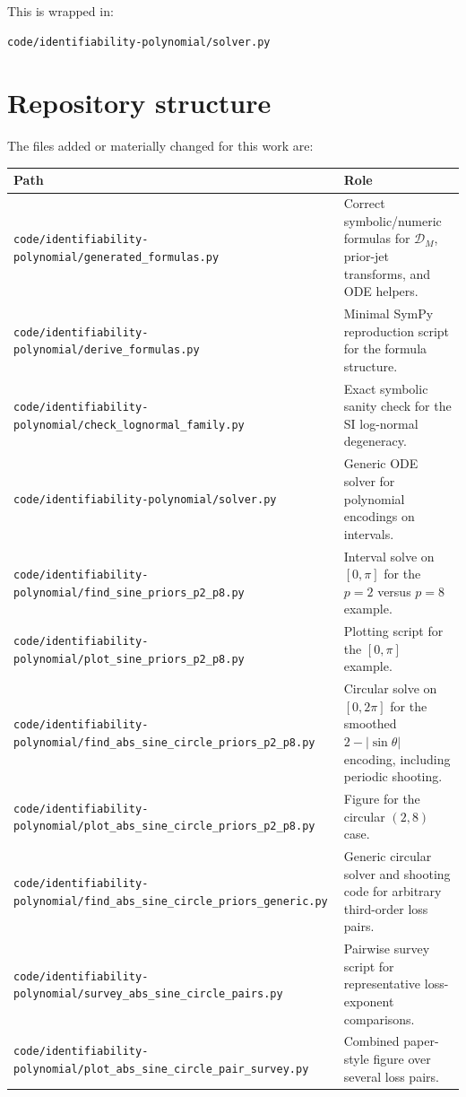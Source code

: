 \documentclass[11pt]{article}
\begin{document}
This is wrapped in:
\begin{Verbatim}[fontsize=\small]
code/identifiability-polynomial/solver.py
\end{Verbatim}

\section{Repository structure}

The files added or materially changed for this work are:

\begin{longtable}{p{}p{}}
\toprule
\textbf{Path} & \textbf{Role} \\
\midrule
\endhead
\texttt{code/identifiability-polynomial/generated\_formulas.py} & Correct symbolic/numeric formulas for $\mathcal{D}_M$, prior-jet transforms, and ODE helpers. \\
\texttt{code/identifiability-polynomial/derive\_formulas.py} & Minimal SymPy reproduction script for the formula structure. \\
\texttt{code/identifiability-polynomial/check\_lognormal\_family.py} & Exact symbolic sanity check for the SI log-normal degeneracy. \\
\texttt{code/identifiability-polynomial/solver.py} & Generic ODE solver for polynomial encodings on intervals. \\
\texttt{code/identifiability-polynomial/find\_sine\_priors\_p2\_p8.py} & Interval solve on $[0,\pi]$ for the $p=2$ versus $p=8$ example. \\
\texttt{code/identifiability-polynomial/plot\_sine\_priors\_p2\_p8.py} & Plotting script for the $[0,\pi]$ example. \\
\texttt{code/identifiability-polynomial/find\_abs\_sine\_circle\_priors\_p2\_p8.py} & Circular solve on $[0,2\pi]$ for the smoothed $2-|\sin\theta|$ encoding, including periodic shooting. \\
\texttt{code/identifiability-polynomial/plot\_abs\_sine\_circle\_priors\_p2\_p8.py} & Figure for the circular $(2,8)$ case. \\
\texttt{code/identifiability-polynomial/find\_abs\_sine\_circle\_priors\_generic.py} & Generic circular solver and shooting code for arbitrary third-order loss pairs. \\
\texttt{code/identifiability-polynomial/survey\_abs\_sine\_circle\_pairs.py} & Pairwise survey script for representative loss-exponent comparisons. \\
\texttt{code/identifiability-polynomial/plot\_abs\_sine\_circle\_pair\_survey.py} & Combined paper-style figure over several loss pairs. \\

\end{longtable}
\end{document}
